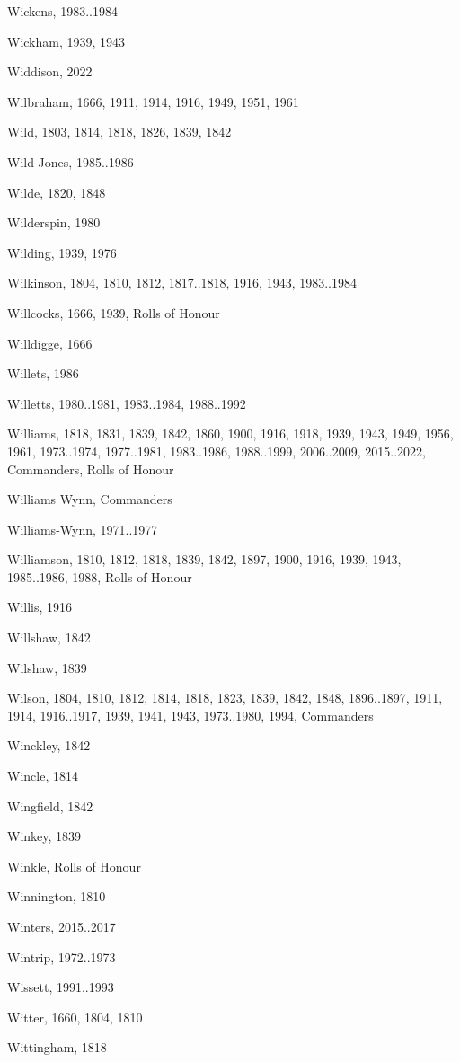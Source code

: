 \begin{theindex}
\item Wickens, 1983..1984
\item Wickham, 1939, 1943
\item Widdison, 2022
\item Wilbraham, 1666, 1911, 1914, 1916, 1949, 1951, 1961
\item Wild, 1803, 1814, 1818, 1826, 1839, 1842
\item Wild-Jones, 1985..1986
\item Wilde, 1820, 1848
\item Wilderspin, 1980
\item Wilding, 1939, 1976
\item Wilkinson, 1804, 1810, 1812, 1817..1818, 1916, 1943, 1983..1984
\item Willcocks, 1666, 1939, Rolls of Honour
\item Willdigge, 1666
\item Willets, 1986
\item Willetts, 1980..1981, 1983..1984, 1988..1992
\item Williams, 1818, 1831, 1839, 1842, 1860, 1900, 1916, 1918, 1939, 1943, 1949, 1956, 1961, 1973..1974, 1977..1981, 1983..1986, 1988..1999, 2006..2009, 2015..2022, Commanders, Rolls of Honour
\item Williams Wynn, Commanders
\item Williams-Wynn, 1971..1977
\item Williamson, 1810, 1812, 1818, 1839, 1842, 1897, 1900, 1916, 1939, 1943, 1985..1986, 1988, Rolls of Honour
\item Willis, 1916
\item Willshaw, 1842
\item Wilshaw, 1839
\item Wilson, 1804, 1810, 1812, 1814, 1818, 1823, 1839, 1842, 1848, 1896..1897, 1911, 1914, 1916..1917, 1939, 1941, 1943, 1973..1980, 1994, Commanders
\item Winckley, 1842
\item Wincle, 1814
\item Wingfield, 1842
\item Winkey, 1839
\item Winkle, Rolls of Honour
\item Winnington, 1810
\item Winters, 2015..2017
\item Wintrip, 1972..1973
\item Wissett, 1991..1993
\item Witter, 1660, 1804, 1810
\item Wittingham, 1818

\end{theindex}
